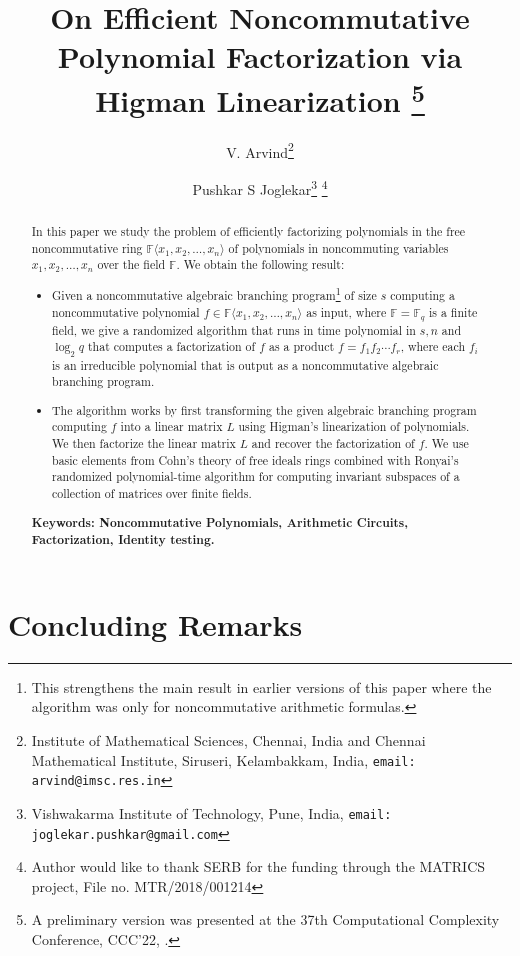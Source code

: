 \documentclass[sloppy,oribibl,envcountsame,envcountsect,11pt]{article}
\title{On Efficient Noncommutative Polynomial Factorization via Higman Linearization \thanks{A preliminary version was presented at 
  the 37th Computational Complexity Conference, CCC'22, \cite{AJ22}.}}
\author{V. Arvind\thanks{Institute of Mathematical Sciences, Chennai,
    India and Chennai Mathematical Institute, Siruseri, Kelambakkam,
    India, \texttt{email: arvind@imsc.res.in}} \and Pushkar S
  Joglekar\thanks{Vishwakarma Institute of Technology, Pune, India,
    \texttt{email: joglekar.pushkar@gmail.com}}
    \thanks{Author would like to thank SERB for the funding through the MATRICS project, File no. MTR/2018/001214}
    }
\date{}
\newcommand{\F}{\mathbb{F}}
\renewcommand{\angle}[1]{\langle #1 \rangle}
\begin{document}
\maketitle

\begin{abstract}

In this paper we study the problem of efficiently factorizing
polynomials in the free noncommutative ring
$\F\angle{x_1,x_2,\ldots,x_n}$ of polynomials in noncommuting
variables $x_1,x_2,\ldots,x_n$ over the field $\F$. We obtain
the following result:

\begin{itemize} 
\item[] Given a noncommutative algebraic branching
  program\footnote{This strengthens the main result in 
    earlier versions of this paper where the algorithm was only
    for noncommutative arithmetic formulas.} of size $s$ computing a
  noncommutative polynomial $f\in\F\angle{x_1,x_2,\ldots,x_n}$ as
  input, where $\F=\F_q$ is a finite field, we give a randomized
  algorithm that runs in time polynomial in $s, n$ and $\log_2q$ that
  computes a factorization of $f$ as a product $f=f_1f_2\cdots f_r$,
  where each $f_i$ is an irreducible polynomial that is output as a
  noncommutative algebraic branching program.
   
\item[] The algorithm works by first transforming the given algebraic
  branching program computing $f$ into a linear matrix $L$ using
  Higman's linearization of polynomials. We then factorize the linear
  matrix $L$ and recover the factorization of $f$. We use basic
  elements from Cohn's theory of free ideals rings combined with
  Ronyai's randomized polynomial-time algorithm for computing
  invariant subspaces of a collection of matrices over finite fields.
\end{itemize}

\noindent\textbf{Keywords: Noncommutative Polynomials, Arithmetic
  Circuits, Factorization, Identity testing.}
\end{abstract}

\newpage

\setcounter{page}{0}
\tableofcontents
\thispagestyle{empty}
\newpage






\section{Concluding Remarks}
\end{document}
